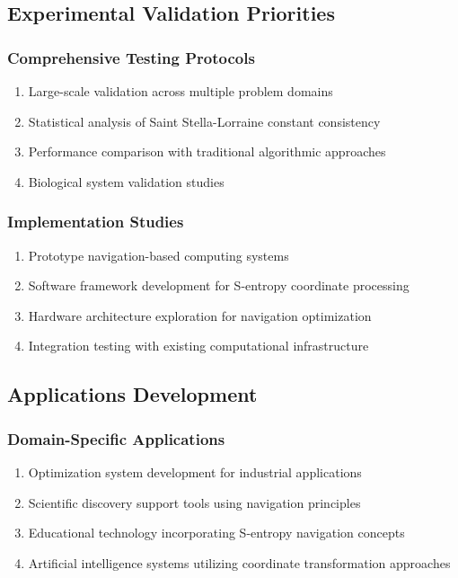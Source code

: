 \documentclass[11pt]{article}
\theoremstyle{definition}
\theoremstyle{remark}
\begin{document}
\subsection{Experimental Validation Priorities}

\subsubsection{Comprehensive Testing Protocols}

\begin{enumerate}
\item Large-scale validation across multiple problem domains
\item Statistical analysis of Saint Stella-Lorraine constant consistency
\item Performance comparison with traditional algorithmic approaches
\item Biological system validation studies
\end{enumerate}

\subsubsection{Implementation Studies}

\begin{enumerate}
\item Prototype navigation-based computing systems
\item Software framework development for S-entropy coordinate processing
\item Hardware architecture exploration for navigation optimization
\item Integration testing with existing computational infrastructure
\end{enumerate}

\subsection{Applications Development}

\subsubsection{Domain-Specific Applications}

\begin{enumerate}
\item Optimization system development for industrial applications
\item Scientific discovery support tools using navigation principles
\item Educational technology incorporating S-entropy navigation concepts
\item Artificial intelligence systems utilizing coordinate transformation approaches
\end{enumerate}
\end{document}
